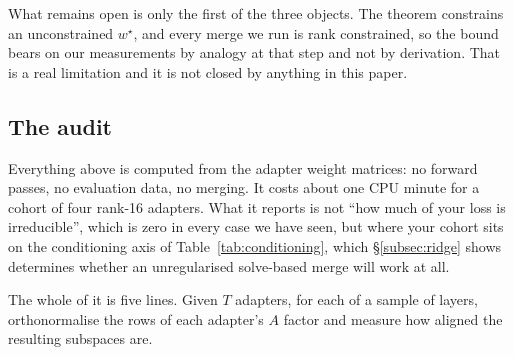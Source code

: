What remains open is only the first of the three objects. The theorem
constrains an unconstrained $w^\star$, and every merge we run is rank
constrained, so the bound bears on our measurements by analogy at that step
and not by derivation. That is a real limitation and it is not closed by
anything in this paper.

\subsection{The audit}
\label{subsec:audit}

Everything above is computed from the adapter weight matrices: no forward
passes, no evaluation data, no merging. It costs about one CPU minute for a
cohort of four rank-16 adapters. What it reports is not ``how much of your loss
is irreducible'', which is zero in every case we have seen, but where your
cohort sits on the conditioning axis of Table~\ref{tab:conditioning}, which
\S\ref{subsec:ridge} shows determines whether an unregularised solve-based
merge will work at all.

The whole of it is five lines. Given $T$ adapters, for each of a sample of
layers, orthonormalise the rows of each adapter's $A$ factor and measure how
aligned the resulting subspaces are.

\begin{center}
\end{center}

